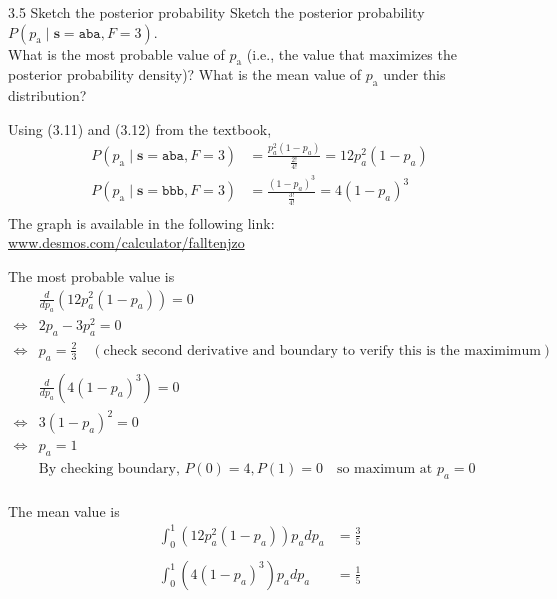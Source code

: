 \documentclass[12pt, a4paper]{article}
\begin{document}
\begin{prob}{3.5}
    Sketch the posterior probability Sketch the posterior probability $P(p_{\text{a}} \mid \mathbf{s} = \texttt{aba}, F = 3)$. \\
What is the most probable value of $p_{\text{a}}$ (i.e., the value that maximizes the posterior probability density)? What is the mean value of $p_{\text{a}}$ under this distribution?

\end{prob}
\begin{sol}
    Using (3.11) and (3.12) from the textbook, 
    \begin{align*}
        P(p_{\text{a}} \mid \mathbf{s} = \texttt{aba}, F = 3) &= \frac{p_a^2 (1-p_a)}{\frac{2!}{4!}} = 12p_a^2 (1-p_a) \\
        P(p_{\text{a}} \mid \mathbf{s} = \texttt{bbb}, F = 3) &= \frac{(1-p_a)^3}{\frac{3!}{4!}} = 4(1-p_a)^3 \\
    \end{align*}
    The graph is available in the following link: \href{https://www.desmos.com/calculator/falltenjzo}{www.desmos.com/calculator/falltenjzo}
    
    The most probable value is 
    \begin{align*}
        & \frac{d}{dp_a}(12p_a^2 (1-p_a)) = 0 \\
        \iff & 2p_a - 3p_a^2 = 0 \\
        \iff & p_a = \frac{2}{3} \quad (\text{check second derivative and boundary to verify this is the maximimum}) \\
        \\
        & \frac{d}{dp_a}(4(1-p_a)^3) = 0 \\
        \iff & 3(1 - p_a)^2 = 0 \\ 
        \iff & p_a = 1 \\
        & \text{By checking boundary, } P(0) = 4, P(1) = 0 \quad \text{so maximum at } p_a = 0 \\
    \end{align*}

    The mean value is
    \begin{align*}
        \int_{0}^{1} (12p_a^2 (1-p_a)) p_a dp_a &= \frac{3}{5} \\
        \\
        \int_{0}^{1} (4(1-p_a)^3) p_a dp_a &= \frac{1}{5} \\
    \end{align*}

\end{sol}
\bigskip
\end{document}
